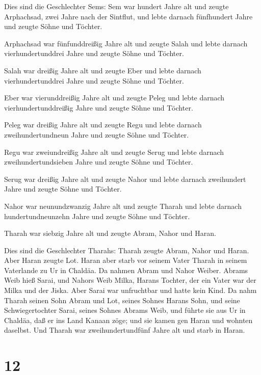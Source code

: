  Dies sind die Geschlechter Sems: Sem war hundert Jahre alt
und zeugte Arphachsad, zwei Jahre nach der Sintflut,  und
lebte darnach fünfhundert Jahre und zeugte Söhne und Töchter.

 Arphachsad war fünfunddreißig Jahre alt und zeugte Salah
 und lebte darnach vierhundertunddrei Jahre und zeugte
Söhne und Töchter.

 Salah war dreißig Jahre alt und zeugte Eber 
und lebte darnach vierhundertunddrei Jahre und zeugte Söhne und Töchter.

 Eber war vierunddreißig Jahre alt und zeugte Peleg
 und lebte darnach vierhundertunddreißig Jahre und zeugte
Söhne und Töchter.

 Peleg war dreißig Jahre alt und zeugte Regu 
und lebte darnach zweihundertundneun Jahre und zeugte Söhne und Töchter.

 Regu war zweiundreißig Jahre alt und zeugte Serug
 und lebte darnach zweihundertundsieben Jahre und zeugte
Söhne und Töchter.

 Serug war dreißig Jahre alt und zeugte Nahor 
und lebte darnach zweihundert Jahre und zeugte Söhne und Töchter.

 Nahor war neunundzwanzig Jahre alt und zeugte Tharah
 und lebte darnach hundertundneunzehn Jahre und zeugte
Söhne und Töchter.

 Tharah war siebzig Jahre alt und zeugte Abram, Nahor und
Haran.

 Dies sind die Geschlechter Tharahs: Tharah zeugte Abram,
Nahor und Haran. Aber Haran zeugte Lot.  Haran aber starb
vor seinem Vater Tharah in seinem Vaterlande zu Ur in Chaldäa.
 Da nahmen Abram und Nahor Weiber. Abrams Weib hieß Sarai,
und Nahors Weib Milka, Harans Tochter, der ein Vater war der Milka und
der Jiska.  Aber Sarai war unfruchtbar und hatte kein Kind.
 Da nahm Tharah seinen Sohn Abram und Lot, seines Sohnes
Harans Sohn, und seine Schwiegertochter Sarai, seines Sohnes Abrams
Weib, und führte sie aus Ur in Chaldäa, daß er ins Land Kanaan zöge; und
sie kamen gen Haran und wohnten daselbst.  Und Tharah war
zweihundertundfünf Jahre alt und starb in Haran.

\hypertarget{section-11}{%
\section{12}\label{section-11}}

